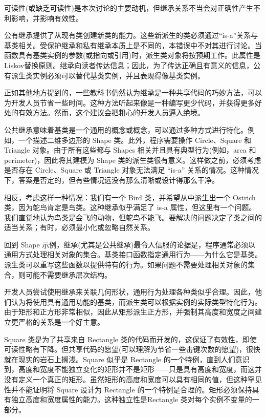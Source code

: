 可读性(或缺乏可读性)是本次讨论的主要动机，但继承关系不当会对正确性产生不利影响，并影响有效性。

公有继承提供了从现有类创建新类的能力。这些新派生的类必须通过“is-a”关系与基类相关。受保护继承和私有继承本质上是不同的，本错误中不对其进行讨论。当函数具有基类实例的参数(或指向或引用)时，派生类对象将按预期工作。此属性是Liskov替换原则。继承向读者传达信息；因此，为了传达正确且有意义的信息，公有派生类实例必须可以替代基类实例，并且表现得像基类实例。


正如其他地方提到的，一些教科书仍然认为继承是一种共享代码的巧妙方法，可以为开发人员节省一些时间。这种方法听起来像是一种编写更少代码，并获得更多好处的有效方法。然而，这个建议会把粗心的开发人员逼入绝境。

公共继承意味着基类是一个通用的概念或概念，可以通过多种方式进行特化。例如，一个描述二维多边形的 Shape 类。此外，程序需要操作 Circle、Square 和 Triangle 对象。由于所有这些都与 Shapes 相关并且具有典型行为(例如，area 和 perimeter)，因此将其建模为 Shape 类的派生类很有意义。这样做之前，必须考虑是否存在 Circle、Square 或 Triangle 对象无法满足 “is-a” 关系的情况。这种情况下，答案是否定的，但有些情况远没有那么清晰或设计得那么干净。

相反，考虑这样一种情况：我们有一个 Bird 类，并希望从中派生出一个 Ostrich 类，因为鸵鸟肯定是鸟类。这种继承似乎满足了 is-a 属性，但这里有一个问题。我们直觉地认为鸟类是会飞的动物，但鸵鸟不能飞。要解决的问题决定了类之间的适当关系；有时，必须最小化或忽略自然关系。

回到 Shape 示例，继承(尤其是公共继承)最令人信服的论据是，程序通常必须以通用方式处理相关对象的集合。基类接口函数指定通用行为——为什么它是基类。派生类可以重写这些函数以提供特有的行为。如果问题不需要处理相关对象的集合，则可能不需要继承层次结构。


开发人员尝试使用继承来关联几何形状，通用行为处理各种类似乎合理。因此，他们认为将使用具有通用功能的基类，而派生类可以根据实例的实际类型特化行为。由于矩形和正方形非常相似，因此从矩形派生正方形，并强制其高度和宽度之间建立更严格的关系是一个好主意。

Square 类是为了共享来自 Rectangle 类的代码而开发的，这保证了有效性，即使可读性略有下降。但共享代码的愿望(可以理解为节省一些击键次数的愿望)，很快就在现实的岩石上搁浅。Square 似乎是 Rectangle 的一个特例，直到人们意识到，高度和宽度不能独立变化的矩形并不是矩形——只是具有高度和宽度，而这并没有定义一个真正的矩形。虽然矩形的高度和宽度可以具有相同的值，但这种罕见性并不能证明将 Square 设计为 Rectangle 的一个特例是合理的。矩形必须保持具有独立高度和宽度属性的能力。这种独立性是Rectangle 类对每个实例不变量的一部分。

